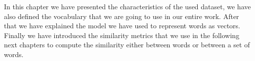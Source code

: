 \documentclass{article}
\begin{document}
In this chapter we have presented the characteristics of the used dataset, we have also defined the vocabulary that we are going to use in our entire work. After that we have explained the model we have used to represent words as vectors. Finally we have introduced the similarity metrics that we use in the following next chapters to compute the similarity either between words or between a set of words.
 


\newpage


\end{document}
